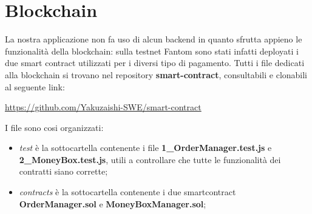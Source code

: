 \section{Blockchain}\label{section:blockchain}

La nostra applicazione non fa uso di alcun backend in quanto sfrutta appieno le funzionalità della blockchain: 
sulla testnet Fantom sono stati infatti deployati i due smart contract utilizzati per i diversi tipo di pagamento.
Tutti i file dedicati alla blockchain si trovano nel repository \textbf{smart-contract}, consultabili e clonabili al seguente link:

\begin{center}
    \href{https://github.com/Yakuzaishi-SWE/smart-contract}{https://github.com/Yakuzaishi-SWE/smart-contract}
\end{center}

I file sono cosi organizzati:
\begin{itemize}
    \item \textit{test} è la sottocartella contenente i file \textbf{1\_OrderManager.test.js} e \textbf{2\_MoneyBox.test.js}, utili a controllare che tutte le funzionalità dei contratti siano corrette;
    \item \textit{contracts} è la sottocartella contenente i due smartcontract \textbf{OrderManager.sol} e \textbf{MoneyBoxManager.sol};
\end{itemize}